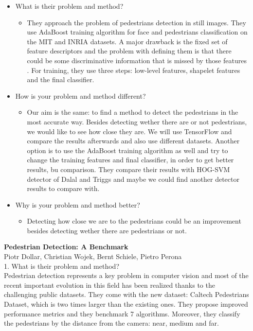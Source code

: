 \documentclass[runningheads,a4paper,11pt]{report}
\begin{document}
\begin{itemize}
	\item What is their problem and method?	
	\begin{itemize}	
		\item They approach the problem of pedestrians detection in still images. They use AdaBoost training algorithm for face and pedestrians classification on the MIT and INRIA datasets.
			A major drawback is the fixed set of feature descriptors  and the problem with defining them is that there could be some discriminative information that is missed by those features . For training, they use three steps: low-level features, shapelet features and the final classifier.
	\end{itemize}
	\item How is your problem and method different?	
	\begin{itemize}
		\item Our aim is the same: to find a method to detect the pedestrians in the most accurate way. Besides detecting wether there are or not pedestrians, we would like to see how close they are. 
	We will use TensorFlow and compare the results afterwards and also use different datasets. 
	Another option is to use the AdaBoost training algorithm as well and try to change the training features and final classifier, in order to get better results, bu comparison.
	They compare their results with HOG-SVM detector of Dalal and Triggs and maybe we could find another detector results to compare with.
	\end{itemize}
	\item Why is your problem and method better?	
	\begin{itemize}
		\item Detecting how close we are to the pedestrians could be an improvement besides detecting wether there are pedestrians or not.
	\end{itemize}
\end{itemize}


\textbf{Pedestrian Detection: A Benchmark} \\
Piotr Dollar, Christian Wojek, Bernt Schiele, Pietro Perona \\

1. What is their problem and method?  \\
Pedestrian detection represents a key problem in computer vision and most of the recent important evolution in this field has been realized thanks to the challenging public datasets. They come with the new dataset: Caltech Pedestrians Dataset, which is two times larger than the existing ones. They propose improved performance metrics and they benchmark 7 algorithms. Moreover, they classify the pedestrians by the distance from the camera: near, medium and far. \\
\end{document}
